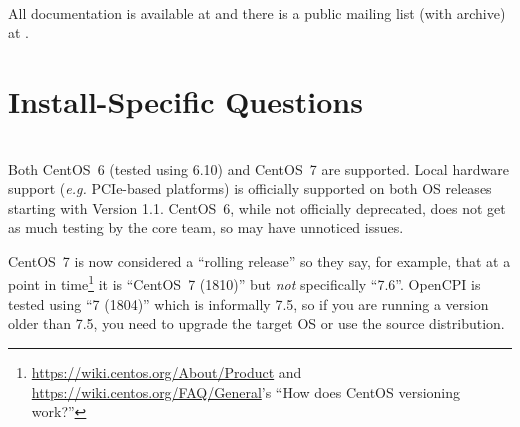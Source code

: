 \begin{description}[style=nextline]
\item[Where can I go for more help?]~\\
\label{faq:halp}%
All documentation is available at \href{https://opencpi.gitlab.io/}{} and there is a public mailing list (with archive) at \href{http://lists.opencpi.org/}{}.
\end{description}

\section{Install-Specific Questions}
\begin{description}[style=nextline]
\item[Does it matter what version of CentOS is used?]~\\
Both CentOS~6 (tested using 6.10) and CentOS~7 are supported. Local hardware support (\textit{e.g.} PCIe-based platforms) is officially supported on both OS releases starting with Version 1.1.
CentOS~6, while not officially deprecated, does not get as much testing by the core team, so may have unnoticed issues.

CentOS~7 is now considered a ``rolling release'' so they say, for example, that at a point in
time\footnote{\url{https://wiki.centos.org/About/Product} and \url{https://wiki.centos.org/FAQ/General}'s ``How does CentOS versioning work?''} it is ``CentOS~7 (1810)'' but \textit{not} specifically ``7.6''.
OpenCPI is tested using ``7 (1804)'' which is informally 7.5, so if you are running a version older than 7.5, you need to upgrade the target OS or use the source distribution.
\end{description}

